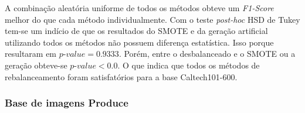 
A combinação aleatória uniforme de todos os métodos obteve um \textit{F1-Score} melhor do que cada método individualmente. Com o teste \textit{post-hoc} HSD de Tukey tem-se um indício de que os resultados do SMOTE e da geração artificial utilizando todos os métodos não possuem diferença estatística. Isso porque resultaram em $\textit{p-value} = 0.9333$. Porém, entre o desbalanceado e o SMOTE ou a geração obteve-se $\textit{p-value} < 0.0$. O que indica que todos os métodos de rebalanceamento foram satisfatórios para a base Caltech101-600.

\subsubsection{Base de imagens Produce}


